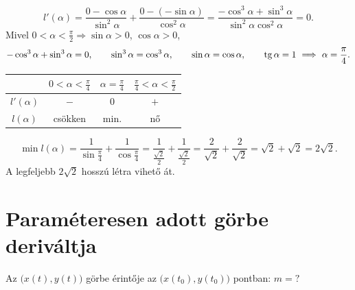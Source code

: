 \documentclass[11pt]{article}
\newcommand{\signtable}{\renewcommand{\arraystretch}{1.45}}
\begin{document}
\begin{solution}
\[
l'(\alpha)=\frac{0-\cos\alpha}{\sin^{2}\alpha}+\frac{0-(-\sin\alpha)}{\cos^{2}\alpha}=\frac{-\cos^{3}\alpha+\sin^{3}\alpha}{\sin^{2}\alpha\cos^{2}\alpha}=0 .
\]
Mivel $0<\alpha<\frac{\pi}{2}\Longrightarrow\sin\alpha>0$, $\cos\alpha>0$,
\[
-\cos^{3}\alpha+\sin^{3}\alpha=0,\qquad \sin^{3}\alpha=\cos^{3}\alpha,\qquad \sin\alpha=\cos\alpha,\qquad \operatorname{tg}\alpha=1\ \Longrightarrow\ \alpha=\frac{\pi}{4}.
\]
\begin{center}
\signtable
\begin{tabular}{c|ccc}
\hline
 & $0<\alpha<\frac{\pi}{4}$ & $\alpha=\frac{\pi}{4}$ & $\frac{\pi}{4}<\alpha<\frac{\pi}{2}$\\
\hline
$l'(\alpha)$ & $-$ & $0$ & $+$\\
$l(\alpha)$ & csökken & min. & nő\\
\hline
\end{tabular}
\end{center}
\[
\min l(\alpha)=\frac{1}{\sin\frac{\pi}{4}}+\frac{1}{\cos\frac{\pi}{4}}=\frac{1}{\frac{\sqrt{2}}{2}}+\frac{1}{\frac{\sqrt{2}}{2}}=\frac{2}{\sqrt{2}}+\frac{2}{\sqrt{2}}=\sqrt{2}+\sqrt{2}=2\sqrt{2}.
\]
A legfeljebb $2\sqrt{2}$ hosszú létra vihető át.
\end{solution}

\section{Paraméteresen adott görbe deriváltja}

\begin{notefig}{Az $\bigl(x(t), y(t)\bigr)$ görbe érintője az $\bigl(x(t_{0}), y(t_{0})\bigr)$ pontban: $m=?$}
\end{notefig}
\end{document}

